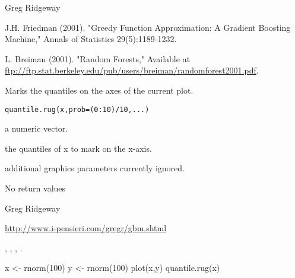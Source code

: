 \documentclass{article}
\begin{document}
\begin{Author}\relax
Greg Ridgeway 
\end{Author}
\begin{References}\relax
J.H. Friedman (2001). "Greedy Function Approximation: A Gradient Boosting
Machine," Annals of Statistics 29(5):1189-1232.

L. Breiman (2001). "Random Forests," Available at \url{ftp://ftp.stat.berkeley.edu/pub/users/breiman/randomforest2001.pdf}.
\end{References}
\begin{SeeAlso}\relax
{}
\end{SeeAlso}

\begin{Description}\relax
Marks the quantiles on the axes of the current plot.
\end{Description}
\begin{Usage}
\begin{verbatim}
quantile.rug(x,prob=(0:10)/10,...)
\end{verbatim}
\end{Usage}
\begin{Arguments}
\begin{ldescription}
\item[\code{x}] a numeric vector.
\item[\code{prob}] the quantiles of x to mark on the x-axis.
\item[\code{...}] additional graphics parameters currently ignored.
\end{ldescription}
\end{Arguments}
\begin{Value}
No return values
\end{Value}
\begin{Author}\relax
Greg Ridgeway 
\end{Author}
\begin{References}\relax
\url{http://www.i-pensieri.com/gregr/gbm.shtml}
\end{References}
\begin{SeeAlso}\relax
{}, 
, 
, 
.
\end{SeeAlso}
\begin{Examples}
\begin{ExampleCode}
x <- rnorm(100)
y <- rnorm(100)
plot(x,y)
quantile.rug(x)
\end{ExampleCode}
\end{Examples}
\end{document}
